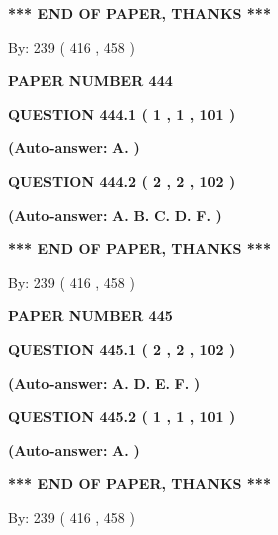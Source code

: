\documentclass[12pt]{article}
\begin{document}
 
   
   
\vspace{1.0in} 
{\textbf{\large{ *** END OF PAPER, THANKS *** }}} 
   
   
\hspace{1.0in} By: 
 239 ( 416 ,  458 )
   
   
   
   
\newpage 
\setcounter{page}{ 
   444001 } 
   
   
 {\textbf{ \Large{ PAPER NUMBER  444  }}}
   
   
  
  
{\textbf{\large{QUESTION
444.1 
 ( 1 , 1 , 101 )
}}}
 
 
{\textbf{(Auto-answer:}}
{\textbf{\large{
A.}}}
{\textbf{)}}
 
 
  
  
{\textbf{\large{QUESTION
444.2 
 ( 2 , 2 , 102 )
}}}
 
 
{\textbf{(Auto-answer:}}
{\textbf{\large{
A.}}}
{\textbf{\large{
B.}}}
{\textbf{\large{
C.}}}
{\textbf{\large{
D.}}}
{\textbf{\large{
F.}}}
{\textbf{)}}
 
 
   
   
\vspace{1.0in} 
{\textbf{\large{ *** END OF PAPER, THANKS *** }}} 
   
   
\hspace{1.0in} By: 
 239 ( 416 ,  458 )
   
   
   
   
\newpage 
\setcounter{page}{ 
   445001 } 
   
   
 {\textbf{ \Large{ PAPER NUMBER  445  }}}
   
   
  
  
{\textbf{\large{QUESTION
445.1 
 ( 2 , 2 , 102 )
}}}
 
 
{\textbf{(Auto-answer:}}
{\textbf{\large{
A.}}}
{\textbf{\large{
D.}}}
{\textbf{\large{
E.}}}
{\textbf{\large{
F.}}}
{\textbf{)}}
 
 
  
  
{\textbf{\large{QUESTION
445.2 
 ( 1 , 1 , 101 )
}}}
 
 
{\textbf{(Auto-answer:}}
{\textbf{\large{
A.}}}
{\textbf{)}}
 
 
   
   
\vspace{1.0in} 
{\textbf{\large{ *** END OF PAPER, THANKS *** }}} 
   
   
\hspace{1.0in} By: 
 239 ( 416 ,  458 )
   
\end{document}
